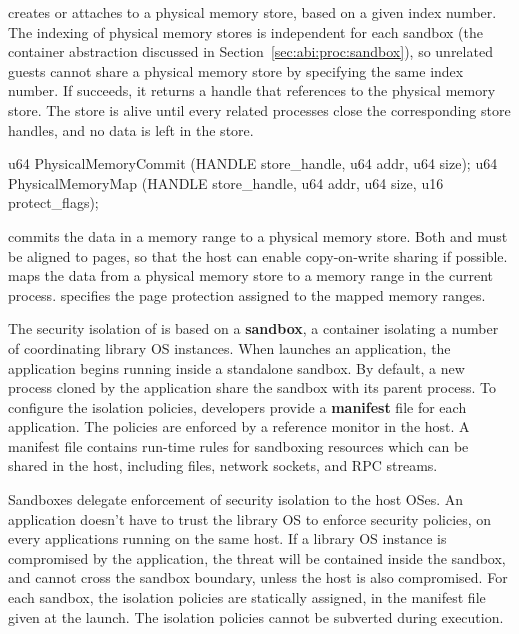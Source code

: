  creates or attaches to a physical memory store,
based on a given index number.
The indexing of physical memory stores is independent for each sandbox (the container abstraction discussed in Section~\ref{sec:abi:proc:sandbox}),
so unrelated guests cannot share a physical memory store by specifying the same index number.
If  succeeds,
it returns a handle that references to the physical memory store.
The store is alive until every related processes close the corresponding store handles,
and no data is left in the store.




\begin{paldef}
u64 PhysicalMemoryCommit (HANDLE store_handle, u64 addr, u64 size);
u64 PhysicalMemoryMap    (HANDLE store_handle, u64 addr, u64 size,
                          u16 protect_flags);
\end{paldef}


 commits the data in a memory range to a physical memory store.
Both  and  must be aligned to pages,
so that the host can enable copy-on-write sharing if possible.
 maps the data from a physical memory store
to a memory range in the current process.
 specifies the page protection assigned to the mapped memory ranges.




\label{sec:abi:proc:sandbox}


The security isolation of \graphene{} is based on a {\bf sandbox}, a container isolating a number of coordinating library OS instances.
When \graphene{} launches an application, the application begins running inside a standalone sandbox.
By default, a new process cloned by the application share the sandbox
with its parent process.
To configure the isolation policies,
developers provide a {\bf manifest} file for each application.
The policies are enforced by a reference monitor in the host.
A manifest file contains run-time rules for sandboxing resources which can be shared in the host,
including files, network sockets, and RPC streams.



Sandboxes delegate
enforcement of security isolation to the host OSes.
An application doesn't have to trust the library OS
to enforce security policies,
on every applications running on the same host.
If a library OS instance is compromised by the application,
the threat will be contained inside the sandbox,
and cannot cross the sandbox boundary, unless the host is also compromised.
For each sandbox,
the isolation policies are statically assigned,
in the manifest file given at the launch.
The isolation policies
cannot be subverted during execution.



